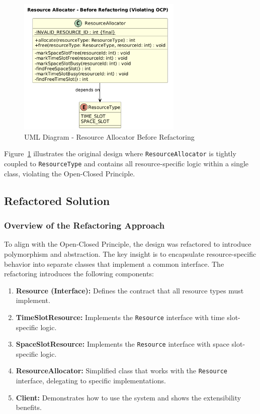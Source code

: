 \begin{figure}[H]
    \centering
    \includegraphics[width=0.7\textwidth]{OCP/plantUML/before.png}
    \caption{UML Diagram - Resource Allocator Before Refactoring}
    \label{fig:ocp_before}
\end{figure}

Figure~\ref{fig:ocp_before} illustrates the original design where \texttt{ResourceAllocator} is tightly coupled to \texttt{ResourceType} and contains all resource-specific logic within a single class, violating the Open-Closed Principle.

\subsection{Refactored Solution}

\subsubsection{Overview of the Refactoring Approach}

To align with the Open-Closed Principle, the design was refactored to introduce polymorphism and abstraction. The key insight is to encapsulate resource-specific behavior into separate classes that implement a common interface. The refactoring introduces the following components:

\begin{enumerate}
    \item \textbf{Resource (Interface):} Defines the contract that all resource types must implement.
    
    \item \textbf{TimeSlotResource:} Implements the \texttt{Resource} interface with time slot-specific logic.
    
    \item \textbf{SpaceSlotResource:} Implements the \texttt{Resource} interface with space slot-specific logic.
    
    \item \textbf{ResourceAllocator:} Simplified class that works with the \texttt{Resource} interface, delegating to specific implementations.
    
    \item \textbf{Client:} Demonstrates how to use the system and shows the extensibility benefits.
\end{enumerate}

